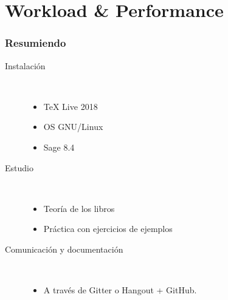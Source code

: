 \section{Workload \& Performance}
%
%
%
%

%

%



\begin{frame}[c]\frametitle{Resumiendo}
\begin{description}
	\item[Instalación] \hfill\\
	\begin{itemize}
		\item \TeX{} Live 2018
		\item OS GNU/Linux
		\item Sage 8.4
	\end{itemize}
	\item[Estudio]\hfill\\
	\begin{itemize}
		\item Teoría de los libros
		\item Práctica con ejercicios de ejemplos
	\end{itemize}
	\item[Comunicación y documentación]\hfill\\
	\begin{itemize}
		\item A través de Gitter o Hangout + GitHub.
	\end{itemize}
\end{description}


\end{frame}